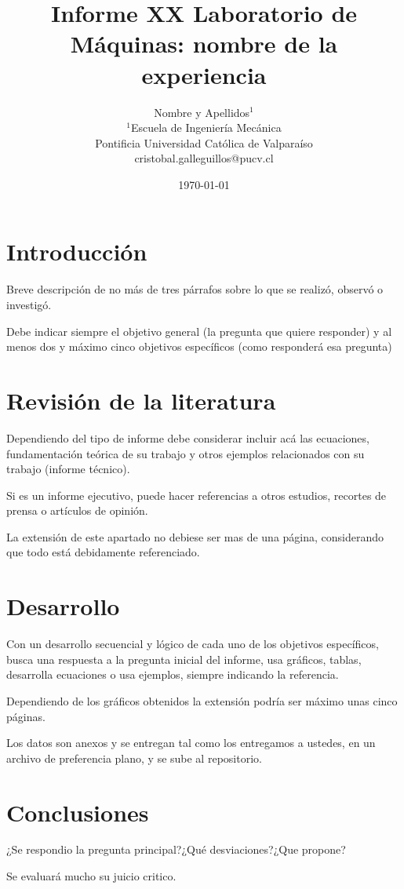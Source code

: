 \documentclass{article}
\title{Informe XX \textbf{Lab}oratorio de Máquinas: nombre de la experiencia}
\author{Nombre y Apellidos$^{1}$\\
\small{$^{1}$Escuela de Ingeniería Mecánica}\\
\small{Pontificia Universidad Católica de Valparaíso}\\
\small{cristobal.galleguillos@pucv.cl}
}
\date{\small{\today}}
\begin{document}
\maketitle

\section{Introducción}

Breve descripción de no más de tres párrafos sobre lo que se realizó, observó o investigó. 

Debe indicar siempre el objetivo general (la pregunta que quiere responder) y al menos dos y máximo cinco objetivos específicos (como responderá esa pregunta)


\section{Revisión de la literatura}

Dependiendo del tipo de informe debe considerar incluir acá las ecuaciones, fundamentación teórica de su trabajo y otros ejemplos relacionados con su trabajo (informe técnico).

Si es un informe ejecutivo, puede hacer referencias a otros estudios, recortes de prensa o artículos de opinión.

La extensión de este apartado no debiese ser mas de una página, considerando que todo está debidamente referenciado.

\section{Desarrollo}

Con un desarrollo secuencial y lógico de cada uno de los objetivos específicos, busca una respuesta a la pregunta inicial del informe, usa gráficos, tablas, desarrolla ecuaciones o usa ejemplos, siempre indicando la referencia.

Dependiendo de los gráficos obtenidos la extensión podría ser máximo unas cinco páginas.

Los datos son anexos y se entregan tal como los entregamos a ustedes, en un archivo de preferencia plano, y se sube al repositorio.

\section{Conclusiones}

¿Se respondio la pregunta principal?¿Qué desviaciones?¿Que propone?

Se evaluará mucho su juicio critico.

\nocite{*}
    
\end{document}
